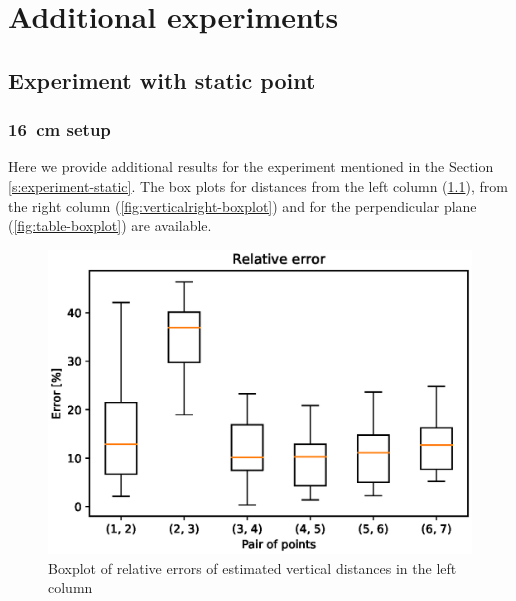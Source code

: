 \chapter{Additional experiments}

\section{Experiment with static point}

\subsection*{16~cm setup}
\label{ss:16results}
Here we provide additional results for the experiment mentioned in the Section
\ref{s:experiment-static}. The box plots for distances from the left column
(\ref{fig:verticalleft-boxplot}), from the right column
(\ref{fig:verticalright-boxplot}) and for the perpendicular plane
(\ref{fig:table-boxplot}) are available.

\begin{figure}
\includegraphics[width=\linewidth]{experiments/leftcolumn.eps}
\caption{Boxplot of relative errors of estimated vertical distances in the left column}
\label{fig:verticalleft-boxplot}
\end{figure}

